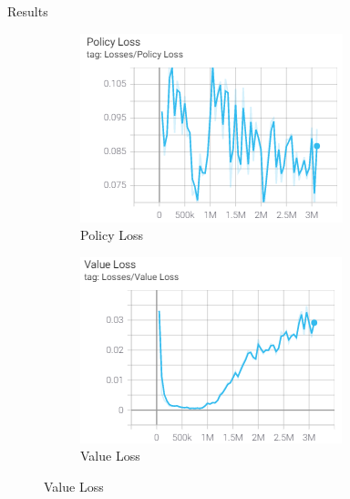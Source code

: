 \documentclass[final]{beamer}
\newlength{\onecolwid}
\newlength{\twocolwid}
\begin{document}
\begin{frame}[t]
\begin{columns}[t]
\begin{column}{\twocolwid}
\begin{columns}[t,totalwidth=\twocolwid]
\begin{column}{\onecolwid}
\begin{block}{Results}
\begin{figure}
\begin{subfigure}[b]{0.4\textwidth}
        \includegraphics[width=\textwidth]{policy_loss.PNG}
        \caption{Policy Loss}
        \label{fig:policy}
    \end{subfigure}
    \begin{subfigure}[b]{0.4\textwidth}
        \includegraphics[width=\textwidth]{value_loss.PNG}
        \caption{Value Loss}
        \label{fig:value loss}
    \end{subfigure}
        \label{fig:unity}
\end{figure}



\end{block}
\end{column}
\end{columns}
\end{column}
\end{columns}
\end{frame}
\end{document}
